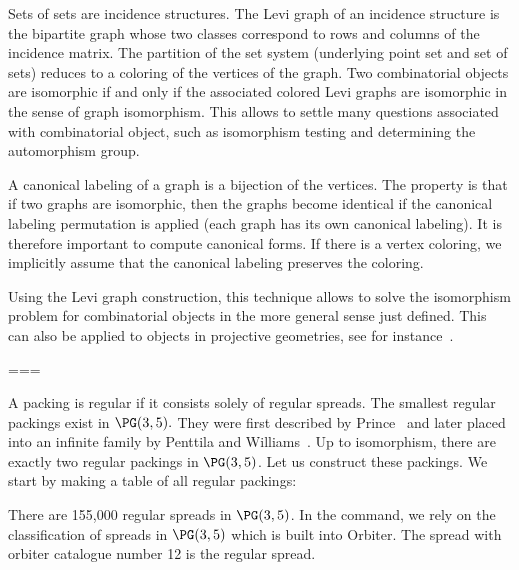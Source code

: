 \bigskip


Sets of sets are incidence structures.
The Levi graph of an incidence structure is the bipartite graph 
whose two classes correspond to rows and columns 
of the incidence matrix. 
The partition of the set system (underlying point set and set of sets) 
reduces to a coloring of the vertices of the graph.
Two combinatorial objects are isomorphic if and only if the associated colored 
Levi graphs are isomorphic in the sense of graph isomorphism. 
This allows to settle many questions associated with combinatorial object, such as 
isomorphism testing and determining the automorphism group.

\bigskip

A canonical labeling of a graph is a bijection of the vertices. 
The property is that if two graphs are isomorphic, then the 
graphs become identical if the canonical labeling permutation is applied 
(each graph has its own canonical labeling). 
It is therefore important to compute canonical forms.
If there is a vertex coloring, 
we implicitly assume that the canonical labeling preserves the coloring.

\bigskip

Using the Levi graph construction, 
this technique allows to solve the isomorphism problem for 
combinatorial objects in the more general sense just defined. 
This can also be applied to objects in projective geometries, 
see for instance~\cite{AlogaidiBetten}.

\bigskip



===




A packing is regular if it consists solely of regular spreads.
The smallest regular packings exist in $\PG(3,5).$ 
They were first described by Prince~\cite{Prince98} 
and later placed into an infinite family by Penttila and Williams~\cite{PenttilaWilliams1998}.
Up to isomorphism, there are exactly two regular packings in $\PG(3,5)$.
Let us construct these packings. 
We start by making a table of all regular packings:
{\tt

}
There are 155,000 regular spreads in $\PG(3,5)$. 
In the command, we rely on the classification of spreads in $\PG(3,5)$ 
which is built into Orbiter. 
The spread with orbiter catalogue number 12 is the regular spread.

\bigskip

